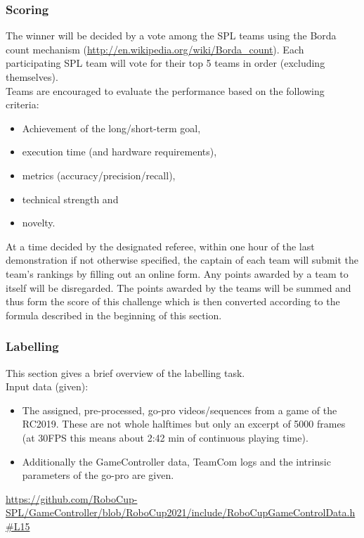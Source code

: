     \subsubsection{Scoring}
    The winner will be decided by a vote among the SPL teams using the Borda count mechanism (\url{http://en.wikipedia.org/wiki/Borda_count}). Each participating SPL team will vote for their top 5 teams in order (excluding themselves).\\ 
    Teams are encouraged to evaluate the performance based on the following criteria: 
    \begin{itemize}
        \item Achievement of the long/short-term goal,
        \item execution time (and hardware requirements),
        \item metrics (accuracy/precision/recall),
        \item technical strength and
        \item novelty.
    \end{itemize}
    At a time decided by the designated referee, within one hour of the last demonstration if not otherwise specified, the captain of each team will submit the team's rankings by filling out an online form. Any points awarded by a team to itself will be disregarded. The points awarded by the teams will be summed and thus form the score of this challenge which is then converted according to the formula described in the beginning of this section.

    \subsubsection{Labelling}
    This section gives a brief overview of the labelling task.\\

    Input data (given):
    \begin{itemize}
        \item The assigned, pre-processed, go-pro videos/sequences from a game of the RC2019. These are not whole halftimes but only an excerpt of 5000 frames (at 30FPS this means about 2:42 min of continuous playing time). 
        \item Additionally the GameController data, TeamCom logs and the intrinsic parameters of the go-pro are given.
    \end{itemize}

\urldef{}\url{https://github.com/RoboCup-SPL/GameController/blob/RoboCup2021/include/RoboCupGameControlData.h#L15}

